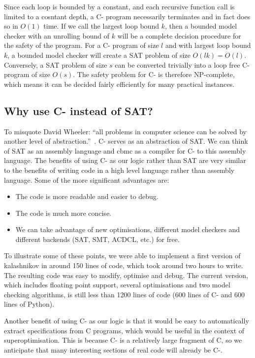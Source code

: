 \documentclass[a4paper]{llncs}
\begin{document}
Since each loop is bounded by a constant, and each recursive function call is
limited to a cosntant depth, a C- program necessarily terminates and in
fact does so in $O(1)$ time.  If we call the largest loop bound $k$, then
a bounded model checker with an unrolling bound of $k$ will be a complete
decision procedure for the safety of the program.  For a C- program of
size $l$ and with largest loop bound $k$, a bounded model checker will
create a SAT problem of size $O(lk) = O(l)$.  Conversely, a SAT problem
of size $s$ can be converted trivially into a loop free C- program
of size $O(s)$.  The safety problem for C- is therefore NP-complete,
which means it can be decided fairly efficiently for many practical
instances.

\subsection{Why use C- instead of SAT?}
To misquote David Wheeler: ``all problems in computer science can be solved by
another level of abstraction.''~\cite{wheeler-abstraction}.  C- serves as
an abstraction of SAT.  We can think of SAT as an assembly language and
{\sc cbmc} as a compiler for C- to this assembly language.  The benefits
of using C- as our logic rather than SAT are very similar to the benefits of
writing code in a high level language rather than assembly language.
Some of the more significant advantages are:

\begin{itemize}
 \item The code is more readable and easier to debug.
 \item The code is much more concise.
 \item We can take advantage of new optimisations, different model
 checkers and different backends (SAT, SMT, ACDCL, etc.) for free.
\end{itemize}

To illustrate some of these points, we were able to implement a first
version of {\sc kalashnikov} in around 150 lines of code, which took
around two hours to write.  The resulting code was easy to modify,
optimise and debug.  The current version, which includes floating point
support, several optimisations and two model checking algorithms,
is still less than 1200 lines of code (600 lines of C- and 600 lines
of Python).

Another benefit of using C- as our logic is that it would be easy to
automatically extract specifications from C programs, which would be
useful in the context of superoptimisation.  This is because C- is
a relatively large fragment of C, so we anticipate that many interesting
sections of real code will already be C-.
\end{document}
